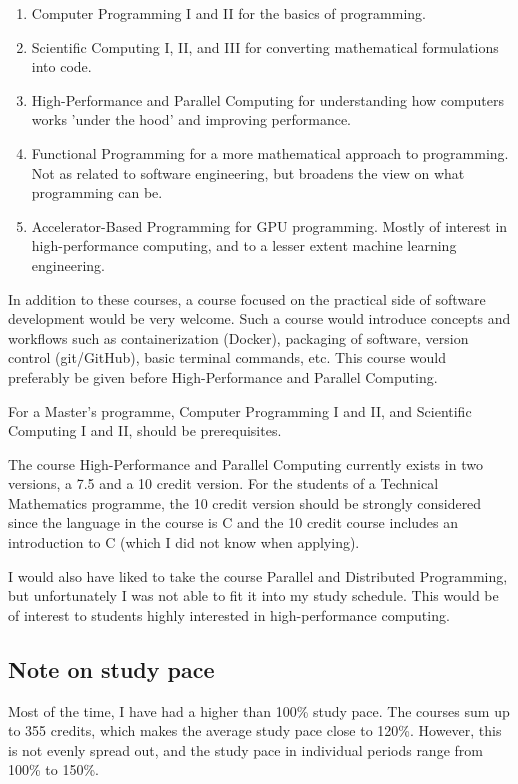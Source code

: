 \documentclass{article}
\begin{document}
  \begin{enumerate}
    \item Computer Programming I and II for the basics of programming.
    \item Scientific Computing I, II, and III for converting mathematical formulations into code.
    \item High-Performance and Parallel Computing for understanding how computers works 'under the hood' and improving performance.
    \item Functional Programming for a more mathematical approach to programming. Not as related to software engineering, but broadens the view on what programming can be.
    \item Accelerator-Based Programming for GPU programming. Mostly of interest in high-performance computing, and to a lesser extent machine learning engineering.
  \end{enumerate}

  In addition to these courses, a course focused on the practical side of software development would be very welcome.
  Such a course would introduce concepts and workflows such as containerization (Docker), packaging of software, version control (git/GitHub), basic terminal commands, etc.
  This course would preferably be given before High-Performance and Parallel Computing.

  For a Master's programme, Computer Programming I and II, and Scientific Computing I and II, should be prerequisites.

  The course High-Performance and Parallel Computing currently exists in two versions, a 7.5 and a 10 credit version.
  For the students of a Technical Mathematics programme, the 10 credit version should be strongly considered since the language in the course is C and the 10 credit course includes an introduction to C (which I did not know when applying).

  I would also have liked to take the course Parallel and Distributed Programming, but unfortunately I was not able to fit it into my study schedule.
  This would be of interest to students highly interested in high-performance computing.

  \subsection{Note on study pace}
  Most of the time, I have had a higher than 100\% study pace.
  The courses sum up to 355 credits, which makes the average study pace close to 120\%.
  However, this is not evenly spread out, and the study pace in individual periods range from 100\% to 150\%.
\end{document}
